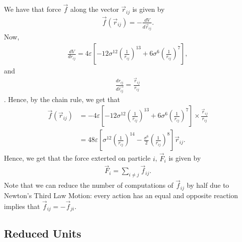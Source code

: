 \documentclass[../Main.tex]{subfiles}
\begin{document}
We have that force $\vec{f}$ along the vector $\vec{r}_{ij}$ is given by
\begin{align*}
\vec{f}\left(\vec{r}_{ij}\right) = -\frac{dV}{d\vec{r}_{ij}}.
\end{align*}
Now,
\begin{align*}
\frac{dV}{dr_{ij}} = 4\varepsilon \left[ -12\sigma^{12}\left( \frac{1}{r_{ij}}\right)^{13} + 6\sigma^{6}\left( \frac{1}{r_{ij}}\right)^{7}\right],
\end{align*}
and
\begin{align*}
\frac{dr_{ij}}{d\vec{r_{ij}}} = \frac{\vec{r}_{ij}}{r_{ij}}
\end{align*}.
Hence, by the chain rule, we get that
\begin{align}
\vec{f}\left(\vec{r}_{ij}\right) & = -4\varepsilon \left[ -12\sigma^{12}\left( \frac{1}{r_{ij}}\right)^{13} + 6\sigma^{6}\left( \frac{1}{r_{ij}}\right)^{7}\right] \times \frac{\vec{r}_{ij}}{r_{ij}} \nonumber \\
& = 48\varepsilon \left[ \sigma^{12}\left( \frac{1}{r_{ij}}\right)^{14} - \frac{\sigma^{6}}{2}\left( \frac{1}{r_{ij}}\right)^{8}\right]\vec{r}_{ij}. \label{eqn:lennard-jones_force_one_atom}
\end{align}
Hence, we get that the force exterted on particle $i$, $\vec{F}_{i}$ is given by
\begin{align*}
	\vec{F}_{i} = \sum_{i \neq j} \vec{f}_{ij}.
\end{align*}
Note that we can reduce the number of computations of $\vec{f}_{ij}$ by half due to Newton's Third Law Motion: every action has an equal and opposite reaction implies that $\vec{f}_{ij} = -\vec{f}_{ji}$.

\subsection{Reduced Units}
\end{document}
